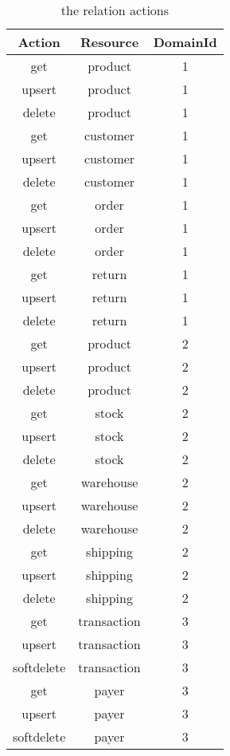 \begin{table}[h]
    \caption{the relation actions}
    \label{table:table-actions}
    \begin{center}
    \begin{tabular}{|c|c|c|}
    \hline
    Action & Resource & DomainId\\
    \hline
    get & product & 1\\
    \hline
    upsert & product & 1\\
    \hline
    delete & product & 1\\
    \hline
    get & customer & 1\\
    \hline
    upsert & customer & 1\\
    \hline
    delete & customer & 1\\
    \hline
    get & order & 1\\
    \hline
    upsert & order & 1\\
    \hline
    delete & order & 1\\
    \hline
    get & return & 1\\
    \hline
    upsert & return & 1\\
    \hline
    delete & return & 1\\
    \hline
    get & product & 2\\
    \hline
    upsert & product & 2\\
    \hline
    delete & product & 2\\
    \hline
    get & stock & 2\\
    \hline
    upsert & stock & 2\\
    \hline
    delete & stock & 2\\
    \hline
    get & warehouse & 2\\
    \hline
    upsert & warehouse & 2\\
    \hline
    delete & warehouse & 2\\
    \hline
    get & shipping & 2\\
    \hline
    upsert & shipping & 2\\
    \hline
    delete & shipping & 2\\
    \hline
    get & transaction & 3\\
    \hline
    upsert & transaction & 3\\
    \hline
    softdelete & transaction & 3\\
    \hline
    get & payer & 3\\
    \hline
    upsert & payer & 3\\
    \hline
    softdelete & payer & 3\\
    \hline
    \end{tabular}
    \end{center}
\end{table}

